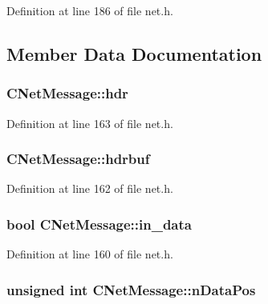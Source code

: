 Definition at line 186 of file net.\+h.



\subsection{Member Data Documentation}
\hypertarget{class_c_net_message_ae7215dca62862a3688f7eeb94646c377}{}
\subsubsection[{hdr}]{ C\+Net\+Message\+::hdr}\label{class_c_net_message_ae7215dca62862a3688f7eeb94646c377}


Definition at line 163 of file net.\+h.

\hypertarget{class_c_net_message_a80a6f95f0c187aa97788118248cbf452}{}
\subsubsection[{hdrbuf}]{ C\+Net\+Message\+::hdrbuf}\label{class_c_net_message_a80a6f95f0c187aa97788118248cbf452}


Definition at line 162 of file net.\+h.

\hypertarget{class_c_net_message_a8f399ad7225f980bdab3ede17b1b23af}{}
\subsubsection[{in\+\_\+data}]{\setlength{\rightskip}{0pt plus 5cm}bool C\+Net\+Message\+::in\+\_\+data}\label{class_c_net_message_a8f399ad7225f980bdab3ede17b1b23af}


Definition at line 160 of file net.\+h.

\hypertarget{class_c_net_message_a418f59287d1805dda6959f27a170c855}{}
\subsubsection[{n\+Data\+Pos}]{\setlength{\rightskip}{0pt plus 5cm}unsigned int C\+Net\+Message\+::n\+Data\+Pos}\label{class_c_net_message_a418f59287d1805dda6959f27a170c855}


